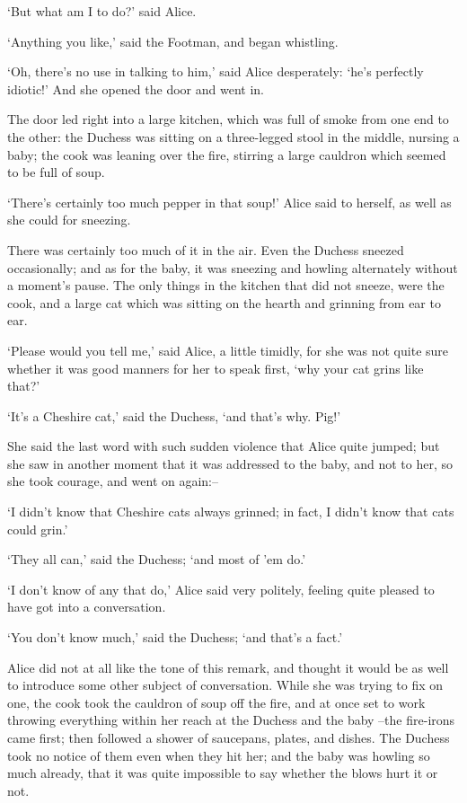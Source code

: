 \documentclass[statementpaper,twoside,openany]{memoir}
\begin{document}
`But what am I to do?' said Alice.

`Anything you like,' said the Footman, and began whistling.

`Oh, there's no use in talking to him,' said Alice desperately: `he's perfectly idiotic!' And she opened the door and went in.

The door led right into a large kitchen, which was full of smoke from one end to the other: the Duchess was sitting on a three-legged stool in the middle, nursing a baby; the cook was leaning over the fire, stirring a large cauldron which seemed to be full of soup.

`There's certainly too much pepper in that soup!' Alice said to herself, as well as she could for sneezing.

There was certainly too much of it in the air. Even the Duchess sneezed occasionally; and as for the baby, it was sneezing and howling alternately without a moment's pause. The only things in the kitchen that did not sneeze, were the cook, and a large cat which was sitting on the hearth and grinning from ear to ear.

`Please would you tell me,' said Alice, a little timidly, for she was not quite sure whether it was good manners for her to speak first, `why your cat grins like that?'

`It's a Cheshire cat,' said the Duchess, `and that's why. Pig!'

She said the last word with such sudden violence that Alice quite jumped; but she saw in another moment that it was addressed to the baby, and not to her, so she took courage, and went on again:--

`I didn't know that Cheshire cats always grinned; in fact, I didn't know that cats could grin.'

`They all can,' said the Duchess; `and most of 'em do.'

`I don't know of any that do,' Alice said very politely, feeling quite pleased to have got into a conversation.

`You don't know much,' said the Duchess; `and that's a fact.'

Alice did not at all like the tone of this remark, and thought it would be as well to introduce some other subject of conversation. While she was trying to fix on one, the cook took the cauldron of soup off the fire, and at once set to work throwing everything within her reach at the Duchess and the baby --the fire-irons came first; then followed a shower of saucepans, plates, and dishes. The Duchess took no notice of them even when they hit her; and the baby was howling so much already, that it was quite impossible to say whether the blows hurt it or not.
\end{document}
